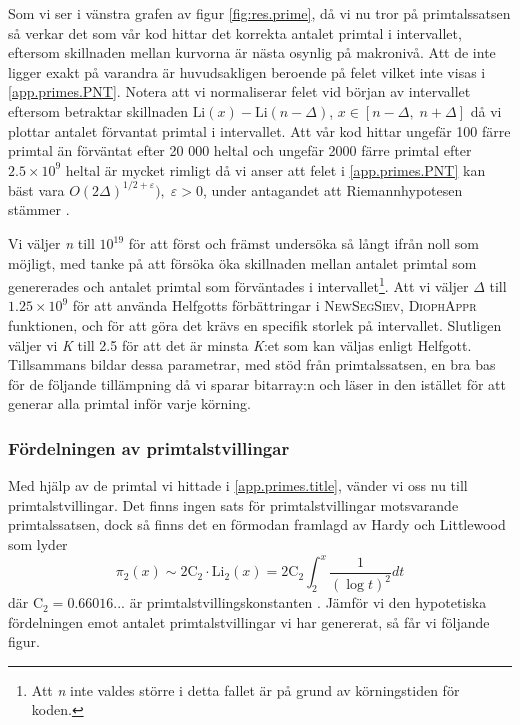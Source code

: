 Som vi ser i vänstra grafen av figur \ref{fig:res.prime}, då vi nu tror på primtalssatsen så verkar det som vår kod hittar det korrekta antalet primtal i intervallet, eftersom skillnaden mellan kurvorna är nästa osynlig på makronivå. 
Att de inte ligger exakt på varandra är huvudsakligen beroende på felet vilket inte visas i \eqref{app.primes.PNT}.
Notera att vi normaliserar felet vid början av intervallet eftersom betraktar skillnaden \(\text{Li}(x) - \text{Li}(n - \Delta)\), \(x\in[n-\Delta,\; n+\Delta]\) då vi plottar antalet förvantat primtal i intervallet.
Att vår kod hittar ungefär 100 färre primtal än förväntat efter 20 000 heltal och ungefär 2000 färre primtal efter \(2.5\times10^9\) heltal är mycket rimligt då vi anser att felet i \eqref{app.primes.PNT} kan bäst vara \(O(2\Delta)^{1/2 + \varepsilon}),\; \varepsilon > 0\), under antagandet att Riemannhypotesen stämmer \cite[Kapitel 5]{RiemannErr}.

Vi väljer \textit{n} till \(10^{19}\) för att först och främst undersöka så långt ifrån noll som möjligt, med tanke på att försöka öka skillnaden mellan antalet primtal som genererades och antalet primtal som förväntades i intervallet\footnote{Att \textit{n} inte valdes större i detta fallet är på grund av körningstiden för koden.}.
Att vi väljer \(\Delta\) till \(1.25\times10^9\) för att använda Helfgotts förbättringar i \textsc{NewSegSiev}, \textsc{DiophAppr} funktionen, och för att göra det krävs en specifik storlek på intervallet.
Slutligen väljer vi \textit{K} till 2.5 för att det är minsta \textit{K}:et som kan väljas enligt Helfgott.
Tillsammans bildar dessa parametrar, med stöd från primtalssatsen, en bra bas för de följande tillämpning då vi sparar bitarray:n och läser in den istället för att generar alla primtal inför varje körning.

\subsubsection{Fördelningen av primtalstvillingar}

Med hjälp av de primtal vi hittade i \ref{app.primes.title}, vänder vi oss nu till primtalstvillingar. Det finns ingen sats för primtalstvillingar motsvarande primtalssatsen, dock så finns det en förmodan framlagd av Hardy och Littlewood \cite[Förmodan B]{Hardy} som lyder
\begin{equation}
    \pi_2(x) \sim 2\text{C}_2\cdot \text{Li}_2(x) = 2\text{C}_2\int_2^x\frac{1}{(\log t)^2}dt\label{app.twins.TWN}
\end{equation}
där \(\text{C}_2 = 0.66016...\) är primtalstvillingskonstanten \cite{TwinPrimeConstant}. Jämför vi den hypotetiska fördelningen emot antalet primtalstvillingar vi har genererat, så får vi följande figur.

